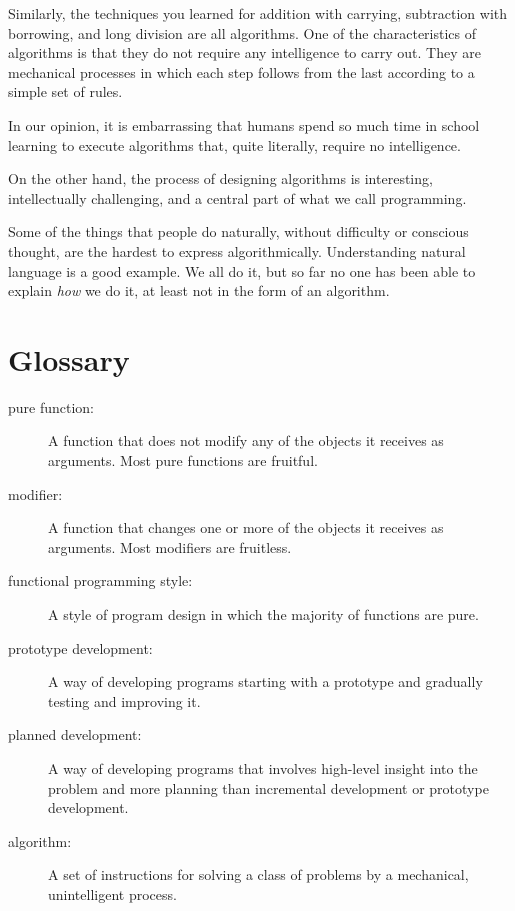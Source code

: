 Similarly, the techniques you learned for addition with carrying,
subtraction with borrowing, and long division are all algorithms.  One
of the characteristics of algorithms is that they do not require any
intelligence to carry out.  They are mechanical processes in which
each step follows from the last according to a simple set of rules.

In our opinion, it is embarrassing that humans spend so much time in
school learning to execute algorithms that, quite literally, require
no intelligence.

On the other hand, the process of designing algorithms is interesting,
intellectually challenging, and a central part of what we call
programming.

Some of the things that people do naturally, without difficulty or
conscious thought, are the hardest to express algorithmically.
Understanding natural language is a good example.  We all do it, but
so far no one has been able to explain {\em how} we do it, at least
not in the form of an algorithm.


\section{Glossary}

\begin{description}

\item[pure function:] A function that does not modify any of the objects it
receives as arguments.  Most pure functions are fruitful.

\item[modifier:] A function that changes one or more of the objects it
receives as arguments.  Most modifiers are fruitless.

\item[functional programming style:] A style of program design in which the
majority of functions are pure.

\item[prototype development:] A way of developing programs starting with a
prototype and gradually testing and improving it.

\item[planned development:] A way of developing programs that involves
high-level insight into the problem and more planning than incremental
development or prototype development.

\item[algorithm:] A set of instructions for solving a class of problems by a
mechanical, unintelligent process.


\end{description}
